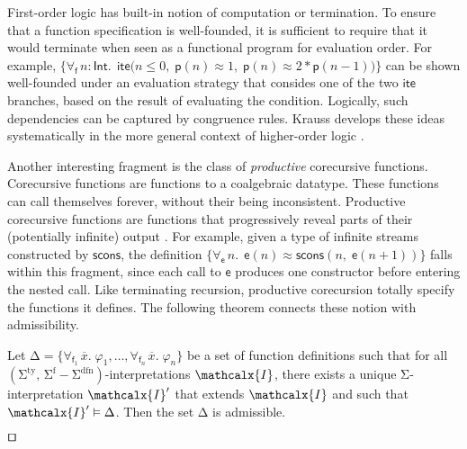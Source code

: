 \documentclass[runningheads,a4paper]{llncs}
\renewcommand\models{\mathrel{\vDash}}
\newcommand\DDD{\Delta}
\newcommand{\con}[1]{\mathsf{#1}}
\let\const=\con
\renewcommand\vec[1]{\overline{#1}}
\let\oldSigma=\Sigma
\def\Sigma{\mathrm{\oldSigma}}
\let\oldDelta=\Delta
\def\Delta{\mathrm{\oldDelta}}
\newcommand{\teq}{\approx}
\newcommand{\I}{\mathcalx{I}}
\newcommand{\stypes}[1]{#1^\mathrm{ty}}
\newcommand{\sfuns}[1]{#1^\mathrm{f}}
\newcommand{\sfundefs}[1]{#1^\mathrm{dfn}}
\newcommand{\typeint}{\ty{Int}}
\newcommand\ty[1]{\con{#1}}
\newcommand{\lite}{\con{ite}}
\newcommand{\forallf}[1]{\forall_{\!#1\:}}
\renewcommand\qed{{\hfill$\squareforqed$}}
\begin{document}
First-order logic has built-in notion of computation or termination. To ensure
that a function specification is well-founded, it is sufficient to require that
it would terminate when seen as a functional program for 
evaluation order. For example,
$\{\forallf{\con{f}} n : {\typeint}.\;\, \lite\bigl(
n \leq 0,\allowbreak\; \con{p}( n ) \teq 1,\allowbreak\; \con{p}( n ) \teq 2 * \con{p}( n - 1 ) \bigr)\}$
can be shown well-founded under an evaluation strategy that consides one of the
two $\lite$ branches, based on the result of evaluating the condition.
Logically, such dependencies can be captured by congruence rules. Krauss
develops these ideas systematically in the more general context of higher-order
logic \cite[Section 2]{krauss-2009-phd}.

Another interesting fragment is the class of \emph{productive} corecursive
functions. Corecursive functions are functions to a coalgebraic datatype.
These functions can call themselves forever, without their being inconsistent.
Productive corecursive functions are functions that progressively reveal parts
of their (potentially infinite)
output \cite{turner-1995,abbott-et-al-2005,mcbride-productive}.
For example, given a type of infinite streams constructed by $\con{scons}$,
the definition
$\{\forallf{\const{e}} n.\;\, \const{e}(n) \teq \con{scons}(n,\; \const{e}(n + 1))\}$
falls within this fragment, since each call to $\const{e}$ produces one
constructor before entering the nested call. Like terminating recursion,
productive corecursion totally specify the functions it defines. The
following theorem connects these notion with admissibility.

\begin{theorem}
Let
$\DDD = \{ \forallf{\con{f}_1} \vec x.\; \varphi_1, \ldots, \forallf{\con{f}_n}
\vec x.\; \varphi_n \}$ be a set of function definitions such that for all
$(\stypes{\Sigma},\, \sfuns{\Sigma} - \sfundefs{\Sigma})$-interpretations
$\I$, there exists a unique
$\Sigma$-interpretation $\I'$ that extends $\I$
and such that $\I' \models \DDD$.
Then the set\/ $\DDD$ is admissible.
\end{theorem}
\begin{proofsketch}
\qed
\end{proofsketch}

\newpage
\end{document}

